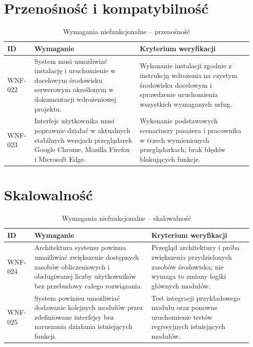 \documentclass[12pt,a4paper,oneside]{report}
\begin{document}
\section{Przenośność i kompatybilność}
\begin{longtable}{|p{1.5cm}|p{8.4cm}|p{3.5cm}|}
\caption{Wymagania niefunkcjonalne -- przenośność}\label{tab:wnf-przenosnosc}\\\hline
\rowcolor{lightblue}\textbf{ID} & \textbf{Wymaganie} & \textbf{Kryterium weryfikacji}\\\hline
WNF-022 & System musi umożliwiać instalację i uruchomienie w docelowym środowisku serwerowym określonym w dokumentacji wdrożeniowej projektu. & Wykonanie instalacji zgodnie z instrukcją wdrożenia na czystym środowisku docelowym i sprawdzenie uruchomienia wszystkich wymaganych usług.\\\hline
WNF-023 & Interfejs użytkownika musi poprawnie działać w aktualnych stabilnych wersjach przeglądarek Google Chrome, Mozilla Firefox i Microsoft Edge. & Wykonanie podstawowych scenariuszy pasażera i pracownika w trzech wymienionych przeglądarkach; brak błędów blokujących funkcje.\\\hline
\end{longtable}

\section{Skalowalność}
\begin{longtable}{|p{1.5cm}|p{8.4cm}|p{3.5cm}|}
\caption{Wymagania niefunkcjonalne -- skalowalność}\label{tab:wnf-skalowalnosc}\\\hline
\rowcolor{lightblue}\textbf{ID} & \textbf{Wymaganie} & \textbf{Kryterium weryfikacji}\\\hline
WNF-024 & Architektura systemu powinna umożliwiać zwiększenie dostępnych zasobów obliczeniowych i obsługiwanej liczby użytkowników bez przebudowy całego rozwiązania. & Przegląd architektury i próba zwiększenia przydzielonych zasobów środowiska; nie wymaga to zmiany logiki głównych modułów.\\\hline
WNF-025 & System powinien umożliwiać dodawanie kolejnych modułów przez zdefiniowane interfejsy bez naruszania działania istniejących funkcji. & Test integracji przykładowego modułu oraz ponowne uruchomienie testów regresyjnych istniejących modułów.\\\hline
\end{longtable}

\end{document}
